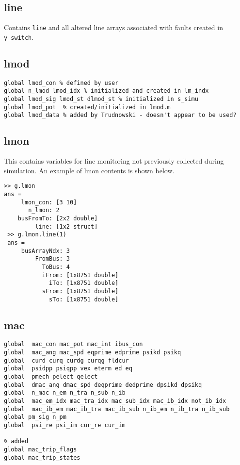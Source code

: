 \subsection{line}  
Contains \verb|line| and all altered line arrays associated with faults created in \verb|y_switch|.

\subsection{lmod}
\begin{verbatim}
global lmod_con % defined by user
global n_lmod lmod_idx % initialized and created in lm_indx
global lmod_sig lmod_st dlmod_st % initialized in s_simu
global lmod_pot  % created/initialized in lmod.m 
global lmod_data % added by Trudnowski - doesn't appear to be used?
\end{verbatim}

\subsection{lmon}  
This contains variables for line monitoring not previously collected during simulation.
An example of lmon contents is shown below.
\begin{verbatim}
>> g.lmon
ans = 
     lmon_con: [3 10]
       n_lmon: 2
    busFromTo: [2x2 double]
         line: [1x2 struct]
 >> g.lmon.line(1)
 ans = 
     busArrayNdx: 3
         FromBus: 3
           ToBus: 4
           iFrom: [1x8751 double]
             iTo: [1x8751 double]
           sFrom: [1x8751 double]
             sTo: [1x8751 double]
\end{verbatim}

\subsection{mac}
\begin{verbatim}
global  mac_con mac_pot mac_int ibus_con
global  mac_ang mac_spd eqprime edprime psikd psikq
global  curd curq curdg curqg fldcur
global  psidpp psiqpp vex eterm ed eq
global  pmech pelect qelect
global  dmac_ang dmac_spd deqprime dedprime dpsikd dpsikq
global  n_mac n_em n_tra n_sub n_ib
global  mac_em_idx mac_tra_idx mac_sub_idx mac_ib_idx not_ib_idx
global  mac_ib_em mac_ib_tra mac_ib_sub n_ib_em n_ib_tra n_ib_sub
global pm_sig n_pm 
global  psi_re psi_im cur_re cur_im

% added
global mac_trip_flags
global mac_trip_states
\end{verbatim}

